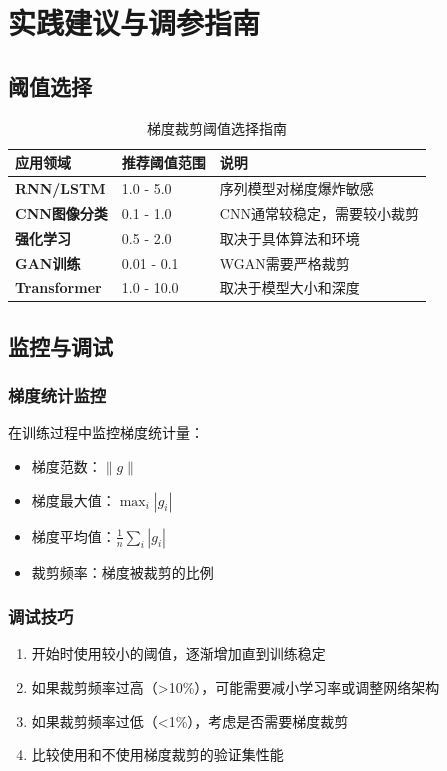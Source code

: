 \documentclass{article}
\begin{document}
\section{实践建议与调参指南}

\subsection{阈值选择}

\begin{table}[h]
\centering
\caption{梯度裁剪阈值选择指南}
\begin{tabular}{|p{}|p{}|p{}|}
\hline
\textbf{应用领域} & \textbf{推荐阈值范围} & \textbf{说明} \\
\hline
\textbf{RNN/LSTM} & 1.0 - 5.0 & 序列模型对梯度爆炸敏感 \\
\hline
\textbf{CNN图像分类} & 0.1 - 1.0 & CNN通常较稳定，需要较小裁剪 \\
\hline
\textbf{强化学习} & 0.5 - 2.0 & 取决于具体算法和环境 \\
\hline
\textbf{GAN训练} & 0.01 - 0.1 & WGAN需要严格裁剪 \\
\hline
\textbf{Transformer} & 1.0 - 10.0 & 取决于模型大小和深度 \\
\hline
\end{tabular}
\end{table}

\subsection{监控与调试}

\subsubsection{梯度统计监控}
在训练过程中监控梯度统计量：
\begin{itemize}
    \item 梯度范数：$\|g\|$
    \item 梯度最大值：$\max_i |g_i|$
    \item 梯度平均值：$\frac{1}{n}\sum_i |g_i|$
    \item 裁剪频率：梯度被裁剪的比例
\end{itemize}

\subsubsection{调试技巧}
\begin{enumerate}
    \item 开始时使用较小的阈值，逐渐增加直到训练稳定
    \item 如果裁剪频率过高（>10\%），可能需要减小学习率或调整网络架构
    \item 如果裁剪频率过低（<1\%），考虑是否需要梯度裁剪
    \item 比较使用和不使用梯度裁剪的验证集性能
\end{enumerate}
\end{document}
